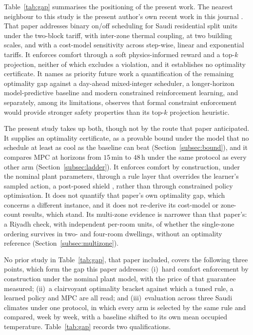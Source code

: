 \documentclass[pdflatex,sn-mathphys-num,iicol]{sn-jnl}
\theoremstyle{thmstyleone}\newtheorem{proposition}{Proposition}\newtheorem{corollary}{Corollary}
\theoremstyle{thmstyletwo}\newtheorem{remark}{Remark}\newtheorem{observation}{Observation}
\theoremstyle{thmstylethree}\newtheorem{definition}{Definition}
\begin{document}
Table~\ref{tab:gap} summarises the positioning of the present work. The nearest neighbour to this study is the present author's own recent work in this journal \citep{Faraj2026}. That paper addresses binary on/off scheduling for Saudi residential split units under the two-block tariff, with inter-zone thermal coupling, at two building scales, and with a cost-model sensitivity across step-wise, linear and exponential tariffs. It enforces comfort through a soft physics-informed reward and a top-$k$ projection, neither of which excludes a violation, and it establishes no optimality certificate. It names as priority future work a quantification of the remaining optimality gap against a day-ahead mixed-integer scheduler, a longer-horizon model-predictive baseline and modern constrained reinforcement learning, and separately, among its limitations, observes that formal constraint enforcement would provide stronger safety properties than its top-$k$ projection heuristic.

The present study takes up both, though not by the route that paper anticipated. It supplies an optimality certificate, as a provable bound under the model that no schedule at least as cool as the baseline can beat (Section~\ref{subsec:bound}), and it compares MPC at horizons from $15\,$min to $48\,$h under the same protocol as every other arm (Section~\ref{subsec:ladder}). It enforces comfort by construction, under the nominal plant parameters, through a rule layer that overrides the learner's sampled action, a post-posed shield \citep{Alshiekh2018}, rather than through constrained policy optimisation. It does not quantify that paper's own optimality gap, which concerns a different instance, and it does not re-derive its cost-model or zone-count results, which stand. Its multi-zone evidence is narrower than that paper's: a Riyadh check, with independent per-room units, of whether the single-zone ordering survives in two- and four-room dwellings, without an optimality reference (Section~\ref{subsec:multizone}).

No prior study in Table~\ref{tab:gap}, that paper included, covers the following three points, which form the gap this paper addresses: (i)~hard comfort enforcement by construction under the nominal plant model, with the price of that guarantee measured; (ii)~a clairvoyant optimality bracket against which a tuned rule, a learned policy and MPC are all read; and (iii)~evaluation across three Saudi climates under one protocol, in which every arm is selected by the same rule and compared, week by week, with a baseline shifted to its own mean occupied temperature. Table~\ref{tab:gap} records two qualifications.
 
\end{document}
